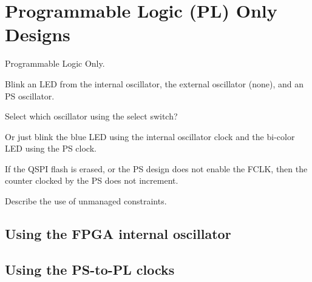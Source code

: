 \section{Programmable Logic (PL) Only Designs}

Programmable Logic Only.

Blink an LED from the internal oscillator, the external oscillator (none),
and an PS oscillator.

Select which oscillator using the select switch?

Or just blink the blue LED using the internal oscillator clock and
the bi-color LED using the PS clock.

If the QSPI flash is erased, or the PS design does not enable the FCLK,
then the counter clocked by the PS does not increment.

Describe the use of unmanaged constraints.


\subsection{Using the FPGA internal oscillator}

\subsection{Using the PS-to-PL clocks}
